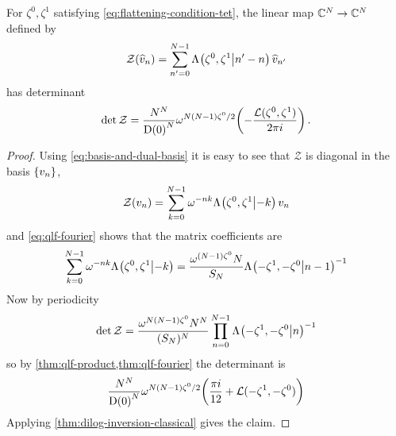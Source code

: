 \documentclass{sl2ams}
\numberwithin{equation}{section}
\newcommand{\CC}{\mathbb{C}}
\begin{document}
\begin{theorem}
  \label{thm:hard-determinant}
  For \(\zeta^0, \zeta^1\) satisfying \eqref{eq:flattening-condition-tet}, the linear map \(\CC^\nr \to \CC^\nr\) defined by 
  \[
    \mathcal{Z}(\vbh n)
    =
    \sum_{n'=0}^{\nr -1}
    \qlf{\zeta^0, \zeta^1}{n'-n}\vbh{n'}
  \]
  has determinant
  \[
    \det \mathcal{Z} = 
    \frac{\nr^{\nr}}{\df{0}^{\nr}}
    \omega^{\nr(\nr-1) \zeta^{0}/2}
    \leftfun(
      -
      \frac{
        \dilr(\zeta^{0}, \zeta^{1})
      }{
        2\pi i
      }
    \rightfun)
    .
    \qedhere
  \]
\end{theorem}
\begin{proof}
  Using \cref{eq:basis-and-dual-basis} it is easy to see that \(\mathcal{Z}\) is diagonal in the basis \(\set{\vb n}\),
  \[
    \mathcal{Z}(\vb n)
    =
    \sum_{k=0}^{\nr-1} \omega^{-nk} \qlf{\zeta^0, \zeta^1}{-k} \vb n
  \]
  and \cref{eq:qlf-fourier} shows that the matrix coefficients are
  \[
    \sum_{k=0}^{\nr-1} \omega^{-nk} \qlf{\zeta^0, \zeta^1}{-k}
    =
    \frac{\omega^{(\nr -1)\zeta^0} \nr}{S_{\nr}}
    \qlf{-\zeta^{1}, -\zeta^{0}}{n - 1}^{-1}
  \]
  Now by periodicity
  \[
    \det \mathcal{Z}
    =
    \frac{\omega^{\nr (\nr -1)\zeta^0} \nr^{\nr} }{(S_{\nr})^{\nr}}
    \prod_{n=0}^{\nr -1}
    \qlf{-\zeta^{1}, -\zeta^{0}}{n}^{-1}
  \]
  so by \cref{thm:qlf-product,thm:qlf-fourier} the determinant is
  \[
    \frac{\nr^{\nr}}{\df{0}^{\nr}}
    \omega^{\nr(\nr-1) \zeta^{0}/2}
    \leftfun(
    \frac{
      \pi i
      }{
      12 
    }
    +
        \dilr(-\zeta^{1}, -\zeta^{0})
    \rightfun)
  \]
  Applying \cref{thm:dilog-inversion-classical} gives the claim.
\end{proof}

\printbibliography
\end{document}
